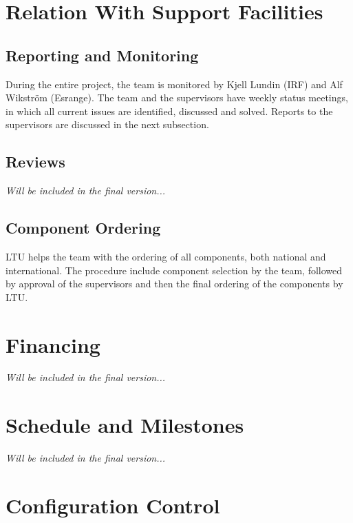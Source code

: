 
\section{Relation With Support Facilities}

\subsection{Reporting and Monitoring}

During the entire project, the team is monitored by Kjell Lundin (\ac{IRF}) and Alf Wikström (Esrange). The team and the supervisors have weekly status meetings, in which all current issues are identified, discussed and solved. Reports to the supervisors are discussed in the next subsection.

\subsection{Reviews}

\textit{Will be included in the final version...}

\subsection{Component Ordering}
\label{subsec:ordering}

\ac{LTU} helps the team with the ordering of all components, both national and international. The procedure include component selection by the team, followed by approval of the supervisors and then the final ordering of the components by \ac{LTU}.

\section{Financing}
\label{sec:financing}

\textit{Will be included in the final version...}

\section{Schedule and Milestones}

\textit{Will be included in the final version...}

\section{Configuration Control}

